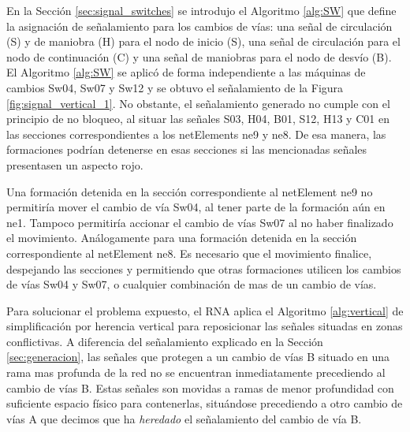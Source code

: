 	En la Sección \ref{sec:signal_switches} se introdujo el Algoritmo \ref{alg:SW} que define la asignación de señalamiento para los cambios de vías: una señal de circulación (S) y de maniobra (H) para el nodo de inicio (S), una señal de circulación para el nodo de continuación (C) y una señal de maniobras para el nodo de desvío (B). El Algoritmo \ref{alg:SW} se aplicó de forma independiente a las máquinas de cambios Sw04, Sw07 y Sw12 y se obtuvo el señalamiento de la Figura \ref{fig:signal_vertical_1}. No obstante, el señalamiento generado no cumple con el principio de no bloqueo, al situar las señales S03, H04, B01, S12, H13 y C01 en las secciones correspondientes a los netElements ne9 y ne8. De esa manera, las formaciones podrían detenerse en esas secciones si las mencionadas señales presentasen un aspecto rojo.
	
	Una formación detenida en la sección correspondiente al netElement ne9 no permitiría mover el cambio de vía Sw04, al tener parte de la formación aún en ne1. Tampoco permitiría accionar el cambio de vías Sw07 al no haber finalizado el movimiento. Análogamente para una formación detenida en la sección correspondiente al netElement ne8. Es necesario que el movimiento finalice, despejando las secciones y permitiendo que otras formaciones utilicen los cambios de vías Sw04 y Sw07, o cualquier combinación de mas de un cambio de vías.
	
	Para solucionar el problema expuesto, el RNA aplica el Algoritmo \ref{alg:vertical} de simplificación por herencia vertical para reposicionar las señales situadas en zonas conflictivas. A diferencia del señalamiento explicado en la Sección \ref{sec:generacion}, las señales que protegen a un cambio de vías B situado en una rama mas profunda de la red no se encuentran inmediatamente precediendo al cambio de vías B. Estas señales son movidas a ramas de menor profundidad con suficiente espacio físico para contenerlas, situándose precediendo a otro cambio de vías A que decimos que ha \emph{heredado} el señalamiento del cambio de vía B.
		

